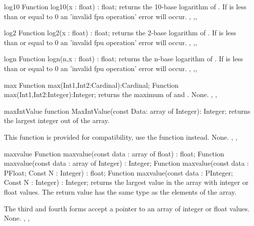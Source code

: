 
\begin{function}{log10}
\Declaration
Function log10(x : float) : float;
\Description
{} returns the 10-base logarithm of .
\Errors
If  is less than or equal to 0 an 'invalid fpu operation' error
will occur.
\SeeAlso
{}, ,,
\end{function}



\begin{function}{log2}
\Declaration
Function log2(x : float) : float;
\Description
{} returns the 2-base logarithm of .
\Errors
If  is less than or equal to 0 an 'invalid fpu operation' error
will occur.
\SeeAlso
{}, ,,
\end{function}



\begin{function}{logn}
\Declaration
Function logn(n,x : float) : float;
\Description
{} returns the n-base logarithm of .
\Errors
If  is less than or equal to 0 an 'invalid fpu operation' error
will occur.
\SeeAlso
{}, ,,
\end{function}


\begin{function}{max}
\Declaration
Function max(Int1,Int2:Cardinal):Cardinal;
Function max(Int1,Int2:Integer):Integer;
\Description
{} returns the maximum of  and .
\Errors
None.
\SeeAlso
{}, , 
\end{function}


\begin{function}{maxIntValue}
\Declaration
function MaxIntValue(const Data: array of Integer): Integer;
\Description
{} returns the largest integer out of the 
array.

This function is provided for \delphi compatibility, use the 
function instead.
\Errors
None.
\SeeAlso
{}, , 
\end{function}



\begin{function}{maxvalue}
\Declaration
Function maxvalue(const data : array of float) : float;
Function maxvalue(const data : array of Integer) : Integer;
Function maxvalue(const data : PFloat; Const N : Integer) : float;
Function maxvalue(const data : PInteger; Const N : Integer) : Integer;
\Description
{} returns the largest value in the  
array with integer or float values. The return value has 
the same type as the elements of the array.

The third and fourth forms accept a pointer to an array of  
integer or float values.
\Errors
None.
\SeeAlso
{}, , 
\end{function}


